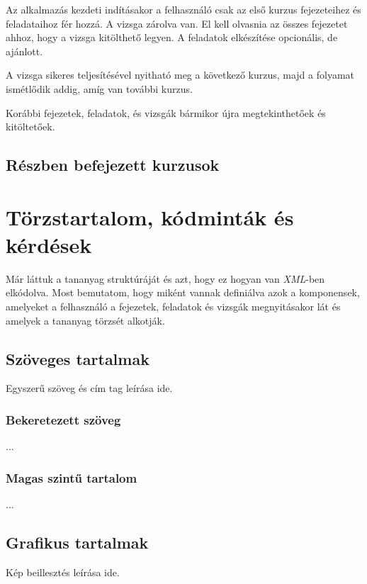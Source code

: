 \documentclass[12pt,a4paper]{article}
\newcommand{\xml}{\textit{XML}\xspace}
\begin{document}
	Az alkalmazás kezdeti indításakor a felhasználó csak az első kurzus fejezeteihez és feladataihoz fér hozzá. A vizsga zárolva van. El kell olvasnia az összes fejezetet ahhoz, hogy a vizsga kitölthető legyen. A feladatok elkészítése opcionális, de ajánlott.
	
	A vizsga sikeres teljesítésével nyitható meg a következő kurzus, majd a folyamat ismétlődik addig, amíg van további kurzus.
	
	Korábbi fejezetek, feladatok, és vizsgák bármikor újra megtekinthetőek és kitöltetőek. 
	
	\subsection{Részben befejezett kurzusok}\label{reszben_befejezett_kurzusok}
	
	\section{Törzstartalom, kódminták és kérdések}\label{torzs_kodmintak_kerdesek}
	
	Már láttuk a tananyag struktúráját és azt, hogy ez hogyan van \xml-ben elkódolva. Most bemutatom, hogy miként vannak definiálva azok a komponensek, amelyeket a felhasználó a fejezetek, feladatok és vizsgák megnyitásakor lát és amelyek a tananyag törzsét alkotják.
	
	\subsection{Szöveges tartalmak}
	
	Egyszerű szöveg és cím tag leírása ide.
	
	\subsubsection{Bekeretezett szöveg}
	
	...
	
	\subsubsection{Magas szintű tartalom}
	
	...
	
	\subsection{Grafikus tartalmak}
	
	Kép beillesztés leírása ide.
	
\end{document}
